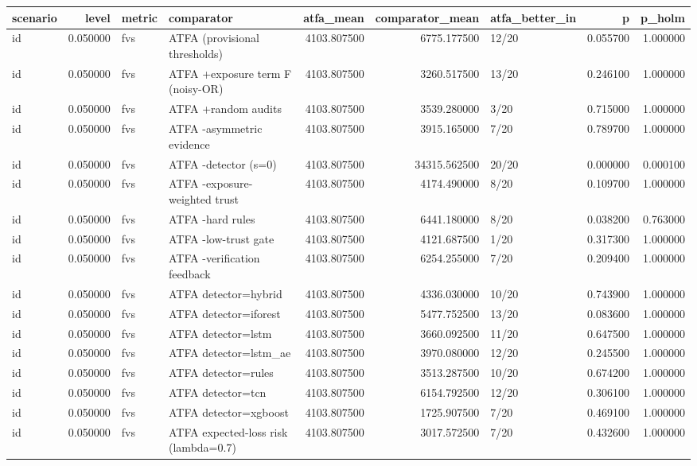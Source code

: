 \begin{tabular}{lrllrrlrr}
\toprule
scenario & level & metric & comparator & atfa\_mean & comparator\_mean & atfa\_better\_in & p & p\_holm \\
\midrule
id & 0.050000 & fvs & ATFA (provisional thresholds) & 4103.807500 & 6775.177500 & 12/20 & 0.055700 & 1.000000 \\
id & 0.050000 & fvs & ATFA +exposure term F (noisy-OR) & 4103.807500 & 3260.517500 & 13/20 & 0.246100 & 1.000000 \\
id & 0.050000 & fvs & ATFA +random audits & 4103.807500 & 3539.280000 & 3/20 & 0.715000 & 1.000000 \\
id & 0.050000 & fvs & ATFA -asymmetric evidence & 4103.807500 & 3915.165000 & 7/20 & 0.789700 & 1.000000 \\
id & 0.050000 & fvs & ATFA -detector (s=0) & 4103.807500 & 34315.562500 & 20/20 & 0.000000 & 0.000100 \\
id & 0.050000 & fvs & ATFA -exposure-weighted trust & 4103.807500 & 4174.490000 & 8/20 & 0.109700 & 1.000000 \\
id & 0.050000 & fvs & ATFA -hard rules & 4103.807500 & 6441.180000 & 8/20 & 0.038200 & 0.763000 \\
id & 0.050000 & fvs & ATFA -low-trust gate & 4103.807500 & 4121.687500 & 1/20 & 0.317300 & 1.000000 \\
id & 0.050000 & fvs & ATFA -verification feedback & 4103.807500 & 6254.255000 & 7/20 & 0.209400 & 1.000000 \\
id & 0.050000 & fvs & ATFA detector=hybrid & 4103.807500 & 4336.030000 & 10/20 & 0.743900 & 1.000000 \\
id & 0.050000 & fvs & ATFA detector=iforest & 4103.807500 & 5477.752500 & 13/20 & 0.083600 & 1.000000 \\
id & 0.050000 & fvs & ATFA detector=lstm & 4103.807500 & 3660.092500 & 11/20 & 0.647500 & 1.000000 \\
id & 0.050000 & fvs & ATFA detector=lstm\_ae & 4103.807500 & 3970.080000 & 12/20 & 0.245500 & 1.000000 \\
id & 0.050000 & fvs & ATFA detector=rules & 4103.807500 & 3513.287500 & 10/20 & 0.674200 & 1.000000 \\
id & 0.050000 & fvs & ATFA detector=tcn & 4103.807500 & 6154.792500 & 12/20 & 0.306100 & 1.000000 \\
id & 0.050000 & fvs & ATFA detector=xgboost & 4103.807500 & 1725.907500 & 7/20 & 0.469100 & 1.000000 \\
id & 0.050000 & fvs & ATFA expected-loss risk (lambda=0.7) & 4103.807500 & 3017.572500 & 7/20 & 0.432600 & 1.000000 \\

\end{tabular}
